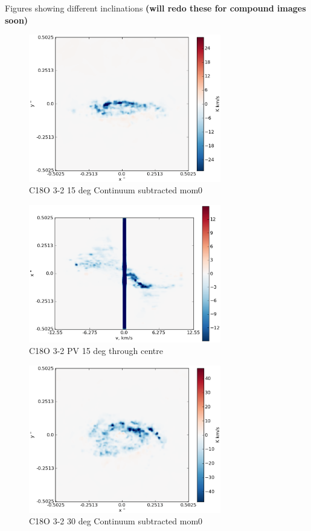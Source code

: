 \documentclass[useAMS,usenatbib]{mn2e}
\begin{document}
Figures showing different inclinations {\bf (will redo these for compound images soon)}
\begin{figure}
 \includegraphics[width=84mm]{Figures/sim/imageC18O_3-2_15deg_contSub.eps}

 \caption{C18O 3-2 15 deg Continuum subtracted mom0}
\end{figure}

%

\begin{figure}
 \includegraphics[width=84mm]{Figures/sim/imageC18O_3-2_15deg_PV_centre.eps}

 \caption{C18O 3-2 PV 15 deg through centre}
\end{figure}


\begin{figure}
 \includegraphics[width=84mm]{Figures/sim/imageC18O_3-2_30deg_contSub.eps}

 \caption{C18O 3-2  30 deg Continuum subtracted mom0}
\end{figure}
\end{document}
